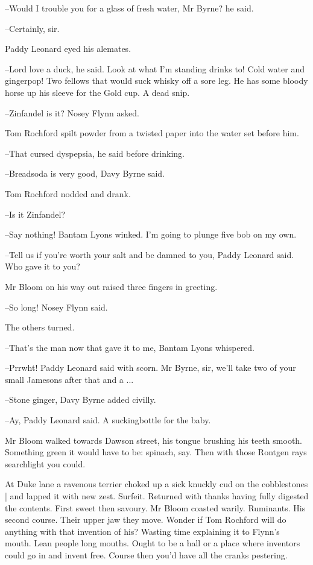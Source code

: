 --Would I trouble you for a glass of fresh water, Mr Byrne?
he said.

--Certainly, sir.

Paddy Leonard eyed his alemates.

--Lord love a duck,
he said.
Look at what I'm standing drinks to!
Cold water and gingerpop!
Two fellows that would suck whisky off a sore leg.
He has some bloody horse up his sleeve for the Gold cup.
A dead snip.

--Zinfandel is it?
Nosey Flynn asked.

Tom Rochford spilt powder from a twisted paper
into the water set before him.

--That cursed dyspepsia,
he said before drinking.

--Breadsoda is very good,
Davy Byrne said.

Tom Rochford nodded and drank.

--Is it Zinfandel?

--Say nothing!
Bantam Lyons winked.
I'm going to plunge five bob on my own.

--Tell us if you're worth your salt and be damned to you,
Paddy Leonard said.
Who gave it to you?

Mr Bloom on his way out raised three fingers in greeting.

--So long!
Nosey Flynn said.

The others turned.

--That's the man now that gave it to me,
Bantam Lyons whispered.

--Prrwht!
Paddy Leonard said with scorn.
Mr Byrne, sir,
we'll take two of your small Jamesons after that and a ...

--Stone ginger,
Davy Byrne added civilly.

--Ay,
Paddy Leonard said.
A suckingbottle for the baby.

Mr Bloom walked towards Dawson street,
his tongue brushing his teeth smooth.
Something green it would have to be:
spinach, say.
Then with those Rontgen rays searchlight
you could.

At Duke lane
a ravenous terrier choked up a sick knuckly cud on the cobblestones |
and lapped it with new zest.
Surfeit.
Returned with thanks having fully digested the contents.
First sweet then savoury.
Mr Bloom coasted warily.
Ruminants.
His second course.
Their upper jaw they move.
Wonder if Tom Rochford will do anything with that invention of his?
Wasting time explaining it to Flynn's mouth.
Lean people long mouths.
Ought to be a hall or a place where inventors could go in and invent free.
Course then you'd have all the cranks pestering.

